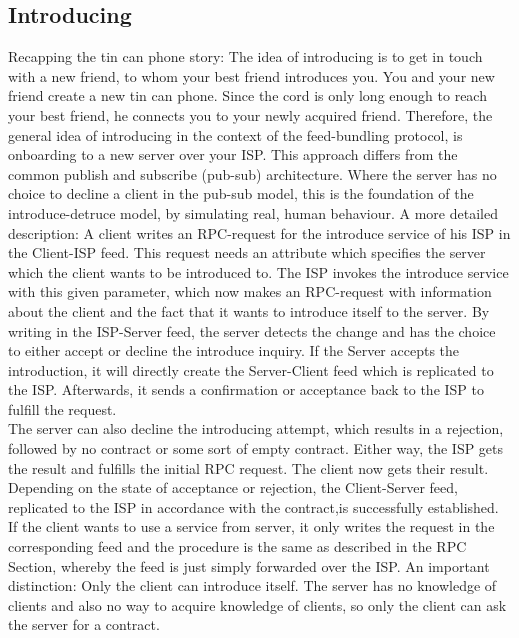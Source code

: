 \subsection{Introducing}
Recapping the tin can phone story: The idea of introducing is to get in touch with a new friend, to whom your best friend introduces you. You and your new friend create a new tin can phone. Since the cord is only long enough to reach your best friend, he connects you to your newly acquired friend. Therefore, the general idea of introducing in the context of the feed-bundling protocol, is onboarding to a new server over your ISP. This approach differs from the common publish and subscribe (pub-sub) architecture. Where the server has no choice to decline a client in the pub-sub model, this is the foundation of the introduce-detruce model, by simulating real, human behaviour. A more detailed description: A client writes an RPC-request for the introduce service of his ISP in the Client-ISP feed. This request needs an attribute which specifies the server which the client wants to be introduced to. The ISP invokes the introduce service with this given parameter, which now makes an RPC-request with information about the client and the fact that it wants to introduce itself to the server. By writing in the ISP-Server feed, the server detects the change and has the choice to either accept or decline the introduce inquiry. If the Server accepts the introduction, it will directly create the Server-Client feed which is replicated to the ISP. Afterwards, it sends a confirmation or acceptance back to the ISP to fulfill the request. 
\\
The server can also decline the introducing attempt, which results in a rejection, followed by no contract or some sort of empty contract. Either way, the ISP gets the result and fulfills the initial RPC request. The client now gets their result. Depending on the state of acceptance or rejection, the Client-Server feed, replicated to the ISP in accordance with the contract,is successfully established. If the client wants to use a service from server, it only writes the request in the corresponding feed and the procedure is the same as described in the RPC Section, whereby the feed is just simply forwarded over the ISP. 
An important distinction: Only the client can introduce itself. The server has no knowledge of clients and also no way to acquire knowledge of clients, so only the client can ask the server for a contract.

